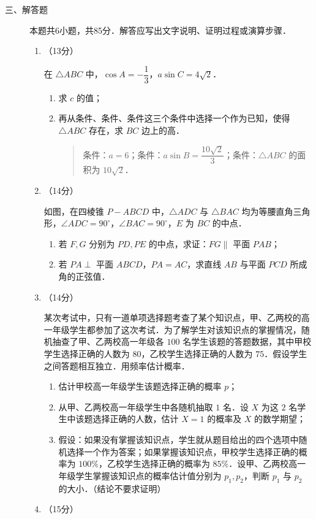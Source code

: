 \begin{description}
    \item[三、解答题] 本题共6小题，共85分．解答应写出文字说明、证明过程或演算步骤．
    \begin{enumerate}[leftmargin=5pt]
      \addtocounter{enumi}{+15}
        \item （13分）

        在 $\triangle ABC$ 中，$\cos A=-\dfrac{1}{3}$，$a\sin C=4\sqrt{2}$．

        \begin{enumerate}[label=(\arabic*)]
            \item 求 $c$ 的值；
            \item 再从条件、条件、条件这三个条件中选择一个作为已知，使得 $\triangle ABC$ 存在，求 $BC$ 边上的高．
            \begin{quote}
            条件：$a=6$；条件：$a\sin B=\dfrac{10\sqrt{2}}{3}$；条件：$\triangle ABC$ 的面积为 $10\sqrt{2}$．
            \end{quote}
        \end{enumerate}

        \item （14分）

        如图，在四棱锥 $P-ABCD$ 中，$\triangle ADC$ 与 $\triangle BAC$ 均为等腰直角三角形，$\angle ADC=90^\circ$，$\angle BAC=90^\circ$，$E$ 为 $BC$ 的中点．

        \begin{enumerate}[label=(\arabic*)]
            \item 若 $F,G$ 分别为 $PD,PE$ 的中点，求证：$FG\parallel$ 平面 $PAB$；
            \item 若 $PA\perp$ 平面 $ABCD$，$PA=AC$，求直线 $AB$ 与平面 $PCD$ 所成角的正弦值．
        \end{enumerate}

        \item （14分）

        某次考试中，只有一道单项选择题考查了某个知识点，甲、乙两校的高一年级学生都参加了这次考试．为了解学生对该知识点的掌握情况，随机抽查了甲、乙两校高一年级各 $100$ 名学生该题的答题数据，其中甲校学生选择正确的人数为 $80$，乙校学生选择正确的人数为 $75$．假设学生之间答题相互独立．用频率估计概率．

        \begin{enumerate}[label=(\arabic*)]
            \item 估计甲校高一年级学生该题选择正确的概率 $p$；
            \item 从甲、乙两校高一年级学生中各随机抽取 $1$ 名．设 $X$ 为这 $2$ 名学生中该题选择正确的人数，估计 $X=1$ 的概率及 $X$ 的数学期望；
            \item 假设：如果没有掌握该知识点，学生就从题目给出的四个选项中随机选择一个作为答案；如果掌握该知识点，甲校学生选择正确的概率为 $100\%$，乙校学生选择正确的概率为 $85\%$．设甲、乙两校高一年级学生掌握该知识点的概率估计值分别为 $p_1,p_2$，判断 $p_1$ 与 $p_2$ 的大小．（结论不要求证明）
        \end{enumerate}
        \item （15分）


\end{enumerate}
\end{description}
